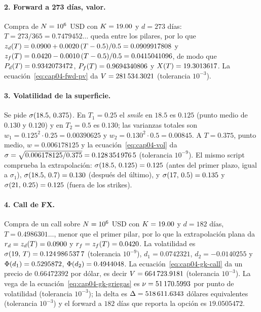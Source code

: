 \paragraph{2. Forward a 273 días, valor.} Compra de $\Nom=10^6$ USD con $\K=19.00$ y $d=273$ días:
$T=273/365=0.7479452\ldots$ queda entre los pilares, por lo que $\zr{d}{T}=0.0900+0.0020\,(T-0.5)/0.5=0.0909917808$ y
$\zr{f}{T}=0.0420-0.0010\,(T-0.5)/0.5=0.0415041096$, de modo que $\DF{d}{T}=0.9342073472$, $\DF{f}{T}=0.9694340806$
y $\FxF{T}=19.3013617$. La ecuación~\eqref{eq:cap04-fwd-pv} da
$\PV=\verif{cap04-fwd-pv-273}{281534.3021}$ \MXN{} (tolerancia $10^{-3}$).

\paragraph{3. Volatilidad de la superficie.} Se pide $\vol(18.5,\,0.375)$. En $T_1=0.25$ el \emph{smile} en
$18.5$ es $0.125$ (punto medio de $0.130$ y $0.120$) y en $T_2=0.5$ es $0.130$; las varianzas totales son
$w_1=0.125^2\cdot0.25=0.00390625$ y $w_2=0.130^2\cdot0.5=0.00845$. A $T=0.375$, punto medio, $w=0.006178125$ y
la ecuación~\eqref{eq:cap04-vol} da $\vol=\sqrt{0.006178125/0.375}=\verif{cap04-vol-superficie}{0.1283549765}$
(tolerancia $10^{-9}$). El mismo script comprueba la extrapolación: $\vol(18.5,\,0.125)=0.125$ (antes del primer
plazo, igual a $\sigma_1$), $\vol(18.5,\,0.7)=0.130$ (después del último), y $\vol(17,\,0.5)=0.135$ y
$\vol(21,\,0.25)=0.125$ (fuera de los strikes).

\paragraph{4. Call de FX.} Compra de un call sobre $\Nom=10^6$ USD con $\K=19.00$ y $d=182$ días,
$T=0.4986301\ldots$, menor que el primer pilar, por lo que la extrapolación plana da $r_d=\zr{d}{T}=0.0900$ y
$r_f=\zr{f}{T}=0.0420$. La volatilidad es $\vol(19,\,T)=\verif{cap04-gk-sigma}{0.1249865377}$ (tolerancia
$10^{-9}$), $d_1=0.0742321$, $d_2=-0.0140255$ y $\Ncdf(d_1)=0.5295872$, $\Ncdf(d_2)=0.4944048$. La
ecuación~\eqref{eq:cap04-gk-call} da un precio de $0.66472392$ \MXN{} por dólar, es decir
$\PV=\verif{cap04-gk-prima}{664723.9181}$ \MXN{} (tolerancia $10^{-3}$). La vega de la
ecuación~\eqref{eq:cap04-gk-griegas} es $\nu=\verif{cap04-gk-vega}{51170.5993}$ \MXN{} por punto de volatilidad
(tolerancia $10^{-3}$); la delta es $\Delta=\verif{cap04-gk-delta}{518611.6343}$ dólares equivalentes (tolerancia $10^{-3}$) y el forward a $182$ días que reporta
la opción es $19.0505472$.

